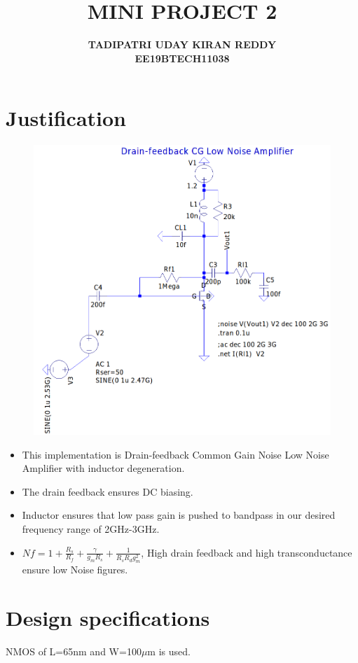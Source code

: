 \documentclass{article}
\begin{document}
\title{{\textbf{MINI PROJECT 2}}}
\author{\textbf{TADIPATRI UDAY KIRAN REDDY}\\\textbf{EE19BTECH11038}}
\maketitle

\section*{\hfil Justification}
\begin{figure}[H]
	\includegraphics[scale=0.4]{../figs/sch.png}
\end{figure}
\begin{itemize}
	\item This implementation is Drain-feedback Common Gain Noise Low Noise Amplifier with inductor degeneration.
	\item The drain feedback ensures DC biasing.
	\item Inductor ensures that low pass gain is pushed to bandpass in our desired frequency range of  2GHz-3GHz.
	\item $Nf = 1 + \frac{R_s}{R_f} + \frac{\gamma}{g_mR_s} + \frac{1}{R_sR_dg_m^2}$, High drain feedback and high transconductance ensure low Noise figures.
\end{itemize}
\section*{\hfil Design specifications}
NMOS of L=65nm and W=100$\mu$m is used.
\end{document}

